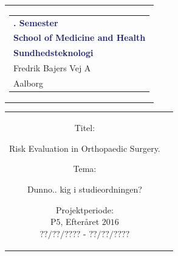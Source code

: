 % 
\thispagestyle{empty}
\begin{nopagebreak}
{\samepage 

\begin{tabular}{r}
\parbox{\textwidth}{  
\hfill \hspace{2cm} \parbox{8cm}{\begin{tabular}{l} %
{\small \textbf{\textcolor{MidnightBlue}{{$5$. Semester}}}}\\
{\small \textbf{\textcolor{MidnightBlue}{School of Medicine and Health}}}\\
{\small \textbf{\textcolor{MidnightBlue}{Sundhedsteknologi}}}\\
{\small \textcolor{NavyBlue}{Fredrik Bajers Vej $7$A}} \\
{\small \textcolor{NavyBlue}{$9220$ Aalborg}} \\
\end{tabular}}}
\end{tabular}

\begin{tabular}{cc}
\parbox{7cm}{
\begin{description}

\item {Titel:}

Risk Evaluation in Orthopaedic Surgery.\\

\item {Tema:} 

\small{
Dunno.. kig i studieordningen?
}

\end{description}

\parbox{8cm}{

\begin{description}
\item {Projektperiode:}\\
   P$5$, Efteråret $2016$\\
   $??/??/????$ - $??/??/????$\\
   

\end{description}}}
\end{tabular}}
\end{nopagebreak}
